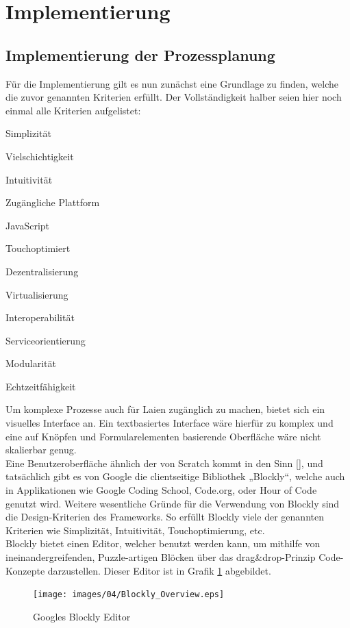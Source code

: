 \section{Implementierung}
\label{sec:implementierung}

\subsection{Implementierung der Prozessplanung}
\label{subsec:prozessplanung_implementierung}

Für die Implementierung gilt es nun zunächst eine Grundlage zu finden, welche die zuvor genannten Kriterien erfüllt. Der Vollständigkeit halber seien hier noch einmal alle Kriterien aufgelistet:
%
\begin{compactenum}[1.]
    \item Simplizität
    \item Vielschichtigkeit
    \item Intuitivität
    \item Zugängliche Plattform
    \item JavaScript
    \item Touchoptimiert
    \item Dezentralisierung
    \item Virtualisierung
    \item Interoperabilität
    \item Serviceorientierung
    \item Modularität
    \item Echtzeitfähigkeit
\end{compactenum}

Um komplexe Prozesse auch für Laien zugänglich zu machen, bietet sich ein visuelles Interface an. Ein textbasiertes Interface wäre hierfür zu komplex und eine auf Knöpfen und Formularelementen basierende Oberfläche wäre nicht skalierbar genug.\\
Eine Benutzeroberfläche ähnlich der von Scratch kommt in den Sinn [\cite{scratchInterface}], und tatsächlich gibt es von Google die clientseitige Bibliothek „Blockly“, welche auch in Applikationen wie Google Coding School, Code.org, oder Hour of Code genutzt wird. Weitere wesentliche Gründe für die Verwendung von Blockly sind die Design-Kriterien des Frameworks. So erfüllt Blockly viele der genannten Kriterien wie Simplizität, Intuitivität, Touchoptimierung, etc.\\
Blockly bietet einen Editor, welcher benutzt werden kann, um mithilfe von ineinandergreifenden, Puzzle-artigen Blöcken über das drag\&drop-Prinzip Code-Konzepte darzustellen. Dieser Editor ist in Grafik \ref{fig:blocklyOverview} abgebildet.
%
\begin{figure}[htbp]
	\centering\texttt{[image: images/04/Blockly\_Overview.eps]}
    \caption{Googles Blockly Editor}
    \label{fig:blocklyOverview}
\end{figure}

